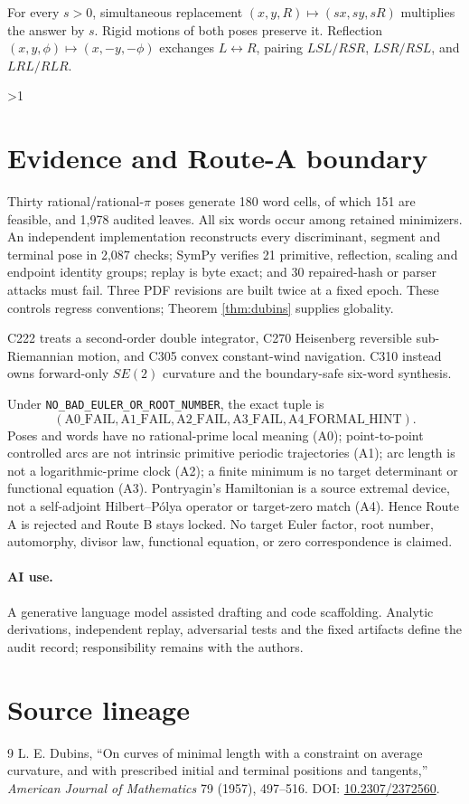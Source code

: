 \documentclass[10pt]{article}
\providecommand{\CRevisionRound}{2}
\begin{document}
For every $s>0$, simultaneous replacement
$(x,y,R)\mapsto(sx,sy,sR)$ multiplies the answer by $s$.  Rigid motions of
both poses preserve it.  Reflection $(x,y,\phi)\mapsto(x,-y,-\phi)$ exchanges
$L\leftrightarrow R$, pairing $LSL/RSR$, $LSR/RSL$, and $LRL/RLR$.
\fi

\ifnum\CRevisionRound>1
\section{Evidence and Route-A boundary}
Thirty rational/rational-$\pi$ poses generate 180 word cells, of which 151
are feasible, and 1,978 audited leaves.  All six words occur among retained
minimizers.  An independent implementation reconstructs every discriminant,
segment and terminal pose in 2,087 checks; SymPy verifies 21 primitive,
reflection, scaling and endpoint identity groups; replay is byte exact; and
30 repaired-hash or parser attacks must fail.  Three PDF revisions are built
twice at a fixed epoch.  These controls regress conventions; Theorem
\ref{thm:dubins} supplies globality.

C222 treats a second-order double integrator, C270 Heisenberg reversible
sub-Riemannian motion, and C305 convex constant-wind navigation.  C310 instead
owns forward-only $SE(2)$ curvature and the boundary-safe six-word synthesis.

Under \texttt{NO\_BAD\_EULER\_OR\_ROOT\_NUMBER}, the exact tuple is
\[
 (\mathrm{A0\_FAIL},\mathrm{A1\_FAIL},\mathrm{A2\_FAIL},
  \mathrm{A3\_FAIL},\mathrm{A4\_FORMAL\_HINT}).
\]
Poses and words have no rational-prime local meaning (A0); point-to-point
controlled arcs are not intrinsic primitive periodic trajectories (A1);
arc length is not a logarithmic-prime clock (A2); a finite minimum is no
target determinant or functional equation (A3).  Pontryagin's Hamiltonian is
a source extremal device, not a self-adjoint Hilbert--P\'olya operator or
target-zero match (A4).  Hence Route A is rejected and Route B stays locked.
No target Euler factor, root number, automorphy, divisor law, functional
equation, or zero correspondence is claimed.

\paragraph{AI use.} A generative language model assisted drafting and code
scaffolding.  Analytic derivations, independent replay, adversarial tests and
the fixed artifacts define the audit record; responsibility remains with the
authors.
\fi

\section*{Source lineage}
\begin{thebibliography}{9}
 L. E. Dubins,
``On curves of minimal length with a constraint on average curvature, and
with prescribed initial and terminal positions and tangents,''
\emph{American Journal of Mathematics} 79 (1957), 497--516.
DOI: \href{https://doi.org/10.2307/2372560}{10.2307/2372560}.
\end{thebibliography}
\end{document}
